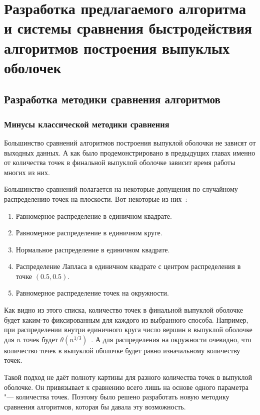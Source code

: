 \chapter{Разработка предлагаемого алгоритма и системы сравнения быстродействия алгоритмов построения выпуклых оболочек} \label{chapt3}

\section{Разработка методики сравнения алгоритмов}

\subsection{Минусы классической методики сравнения}

Большинство сравнений алгоритмов построения выпуклой оболочки не зависят от выходных данных. А как было продемонстрировано в предыдущих главах именно от количества точек в финальной выпуклой оболочке зависит время работы многих из них.

Большинство сравнений полагается на некоторые допущения по случайному распределению точек на плоскости. Вот некоторые из них~\cite{chadnov2004algorithmsComparison}:

\begin{enumerate}
	\item Равномерное распределение в единичном квадрате.
	\item Равномерное распределение в единичном круге.
	\item Нормальное распределение в единичном квадрате.
	\item Распределение Лапласа в единичном квадрате с центром распределения в точке $(0.5, 0.5)$.
	\item Равномерное распределение точек на окружности.
\end{enumerate}

Как видно из этого списка, количество точек в финальной выпуклой оболочке будет каким-то фиксированным для каждого из выбранного способа. Например, при распределении внутри единичного круга число вершин в выпуклой оболочке для $n$ точек будет $\theta(n^{1/3})$~\cite{algolist2010convexhull}. А для распределения на окружности очевидно, что количество точек в выпуклой оболочке будет равно изначальному количеству точек.

Такой подход не даёт полноту картины для разного количества точек в выпуклой оболочке. Он привязывает к сравнению всего лишь на основе одного параметра "--- количества точек. Поэтому было решено разработать новую методику сравнения алгоритмов, которая бы давала эту возможность.

